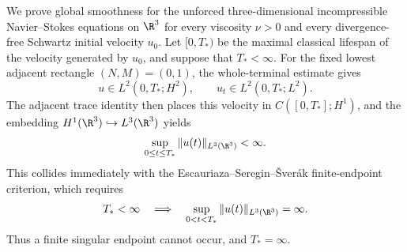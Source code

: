 
We prove global smoothness for the unforced three-dimensional incompressible Navier--Stokes equations on \(\R^3\) for every viscosity \(\nu>0\) and every divergence-free Schwartz initial velocity \(u_0\).
Let \([0,T_*)\) be the maximal classical lifespan of the velocity generated by \(u_0\), and suppose that \(T_*<\infty\).
For the fixed lowest adjacent rectangle \((N,M)=(0,1)\), the whole-terminal estimate gives
\[
u\in L^2(0,T_*;H^2),
\qquad
u_t\in L^2(0,T_*;L^2).
\]
The adjacent trace identity then places this velocity in \(C([0,T_*];H^1)\), and the embedding \(H^1(\R^3)\hookrightarrow L^3(\R^3)\) yields
\[
\sup_{0\leq t\leq T_*}\|u(t)\|_{L^3(\R^3)}<\infty.
\]
This collides immediately with the Escauriaza--Seregin--\v{S}ver\'ak finite-endpoint criterion, which requires
\[
T_*<\infty
\quad\Longrightarrow\quad
\sup_{0<t<T_*}\|u(t)\|_{L^3(\R^3)}=\infty.
\]
Thus a finite singular endpoint cannot occur, and \(T_*=\infty\).
